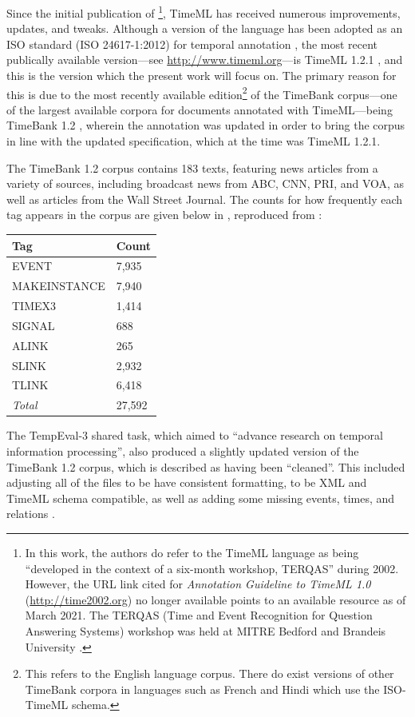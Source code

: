 \documentclass[a4paper,12pt,leqno]{article}
\begin{document}
Since the initial publication of \citet{pustejovsky2003timeml}\footnote{In this work, the authors do refer to the TimeML language as being ``developed in the context of a six-month workshop, TERQAS'' during 2002. However, the URL link cited for \textit{Annotation Guideline to TimeML 1.0} (\url{http://time2002.org}) no longer available points to an available resource as of March 2021. The TERQAS (Time and Event Recognition for Question Answering Systems) workshop was held at MITRE Bedford and Brandeis University \citep[p. 647]{pustejovsky2003timebank}.}, TimeML has received numerous improvements, updates, and tweaks. Although a version of the language has been adopted as an ISO standard (ISO 24617-1:2012) for temporal annotation \citep{pustejovsky2010iso}, the most recent publically available version---see \url{http://www.timeml.org}---is TimeML 1.2.1 \citep{timeml2005timeml,sauri2006timeml}, and this is the version which the present work will focus on. The primary reason for this is due to the most recently available edition\footnote{This refers to the English language corpus. There do exist versions of other TimeBank corpora in languages such as French \citep{bittar2011french} and Hindi \citep{goel2020hindi} which use the ISO-TimeML schema.} of the TimeBank corpus---one of the largest available corpora for documents annotated with TimeML---being TimeBank 1.2 \citep{pustejovsky2006timebank}, wherein the annotation was updated in order to bring the corpus in line with the updated specification, which at the time was TimeML 1.2.1.

The TimeBank 1.2 corpus contains 183 texts, featuring news articles from a variety of sources, including broadcast news from ABC, CNN, PRI, and VOA, as well as articles from the Wall Street Journal. The counts for how frequently each tag appears in the corpus are given below in , reproduced from \citet{pustejovsky2006timebank}:
\begin{center}
	\onehalfspacing
	\begin{tabular}[h!]{|l l|}
		\hline
		\textbf{Tag} & \textbf{Count}\\
		\hline
		EVENT & 7,935\\
		MAKEINSTANCE & 7,940\\
		TIMEX3 & 1,414\\
		SIGNAL & 688\\
		ALINK & 265\\
		SLINK & 2,932\\
		TLINK & 6,418\\
		\textit{Total} & 27,592\\
		\hline
	\end{tabular}
	\label{fig:timebank-stats}
\end{center}
The TempEval-3 \citep{uzzaman2013semeval} shared task, which aimed to ``advance research on temporal information processing'', also produced a slightly updated version of the TimeBank 1.2 corpus, which is described as having been ``cleaned''. This included adjusting all of the files to be have consistent formatting, to be XML and TimeML schema compatible, as well as adding some missing events, times, and relations \citep[p. 2]{uzzaman2013semeval}.
\end{document}
